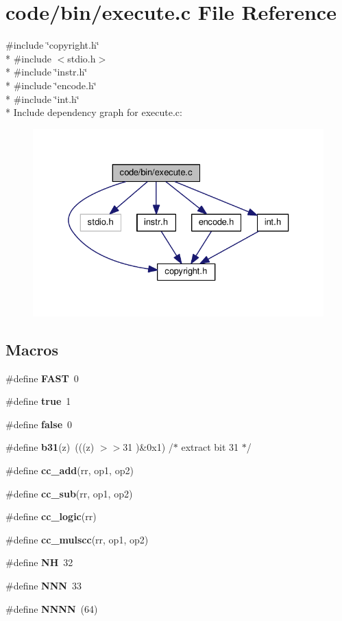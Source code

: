\section{code/bin/execute.c File Reference}
\label{execute_8c}
{\ttfamily \#include \char`\"{}copyright.\+h\char`\"{}}\\*
{\ttfamily \#include $<$stdio.\+h$>$}\\*
{\ttfamily \#include \char`\"{}instr.\+h\char`\"{}}\\*
{\ttfamily \#include \char`\"{}encode.\+h\char`\"{}}\\*
{\ttfamily \#include \char`\"{}int.\+h\char`\"{}}\\*
Include dependency graph for execute.\+c\+:
\nopagebreak
\begin{figure}[H]
\begin{center}
\leavevmode
\includegraphics[width=329pt]{execute_8c__incl}
\end{center}
\end{figure}
\subsection*{Macros}
\begin{DoxyCompactItemize}
\item 
\#define {\bf F\+A\+ST}~0
\item 
\#define {\bf true}~1
\item 
\#define {\bf false}~0
\item 
\#define {\bf b31}(z)~(((z) $>$$>$31 )\&0x1)	/$\ast$ extract bit 31 $\ast$/
\item 
\#define {\bf cc\+\_\+add}(rr,  op1,  op2)
\item 
\#define {\bf cc\+\_\+sub}(rr,  op1,  op2)
\item 
\#define {\bf cc\+\_\+logic}(rr)
\item 
\#define {\bf cc\+\_\+mulscc}(rr,  op1,  op2)
\item 
\#define {\bf NH}~32
\item 
\#define {\bf N\+NN}~33
\item 
\#define {\bf N\+N\+NN}~(64)
\end{DoxyCompactItemize}
